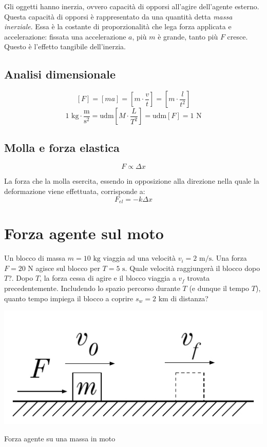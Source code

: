 \noindent Gli oggetti hanno inerzia, ovvero capacità di opporsi all'agire dell'agente
esterno. Questa capacità di opporsi è rappresentato da una quantità detta
\textit{massa inerziale}. Essa è la costante di proporzionalità che lega forza applicata
e accelerazione: fissata una accelerazione $a$, più $m$ è grande, tanto più $F$ cresce.
Questo è l'effetto tangibile dell'inerzia.

\subsection{Analisi dimensionale}
\[ [F] = [ma] = \left[m\cdot\frac{v}{t}\right] = \left[m\cdot\frac{l}{t^2}\right]  \]
\[ 1\text{ kg}\cdot\frac{\text{m}}{\text{s}^2} = \text{udm}\left[M\cdot\frac{L}{T^2}\right] = \text{udm}[F] = 1\text{ N} \]


\subsection{Molla e forza elastica}
\[ F \propto \Delta x \]

La forza che la molla esercita, essendo in opposizione alla direzione nella
quale la deformazione viene effettuata, corrisponde a:
\[ F_\textit{el} = -k\Delta x \]

\section{Forza agente sul moto}
Un blocco di massa $m = 10 \text{ kg}$ viaggia ad una velocità $v_i =
2 \text{ m/s}$. Una forza $F = 20 \text{ N}$ agisce sul blocco per
$T = 5 \text{ s}$. Quale velocità raggiungerà il blocco dopo $T$?.
Dopo $T$, la forza cessa di agire e il blocco viaggia a $v_f$ trovata
precedentemente. Includendo lo spazio percorso durante $T$ (e dunque il
tempo $T$), quanto tempo impiega il blocco a coprire $s_w = 2\text{ km}$
di distanza?

\begin{marginfigure}
    \centering
    \includegraphics[width = \marginparwidth]{figures/scivola.pdf}
    \caption{Forza agente su una massa in moto}
\end{marginfigure}

